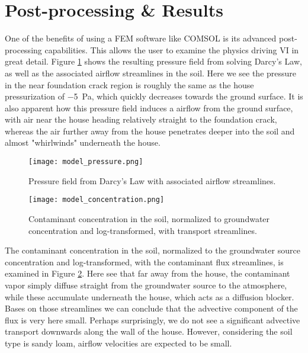 \section{Post-processing \& Results}

One of the benefits of using a FEM software like COMSOL is its advanced post-processing capabilities.
This allows the user to examine the physics driving VI in great detail.
Figure \ref{fig:model_pressure} shows the resulting pressure field from solving Darcy's Law, as well as the associated airflow streamlines in the soil.
Here we see the pressure in the near foundation crack region is roughly the same as the house pressurization of \SI{-5}{\pascal}, which quickly decreases towards the ground surface.
It is also apparent how this pressure field induces a airflow from the ground surface, with air near the house heading relatively straight to the foundation crack, whereas the air further away from the house penetrates deeper into the soil and almost "whirlwinds" underneath the house.\par

\begin{figure}[htb!]
  \texttt{[image: model\_pressure.png]}
  \caption{Pressure field from Darcy's Law with associated airflow streamlines.}
  \label{fig:model_pressure}
\end{figure}

\begin{figure}[htb!]
  \texttt{[image: model\_concentration.png]}
  \caption{Contaminant concentration in the soil, normalized to groundwater concentration and log-transformed, with transport streamlines.}
  \label{fig:model_concentration}
\end{figure}

The contaminant concentration in the soil, normalized to the groundwater source concentration and log-transformed, with the contaminant flux streamlines, is examined in Figure \ref{fig:model_concentration}.
Here see that far away from the house, the contaminant vapor simply diffuse straight from the groundwater source to the atmosphere, while these accumulate underneath the house, which acts as a diffusion blocker.
Bases on those streamlines we can conclude that the advective component of the flux is very here small.
Perhaps surprisingly, we do not see a significant advective transport downwards along the wall of the house.
However, considering the soil type is sandy loam, airflow velocities are expected to be small.\par


